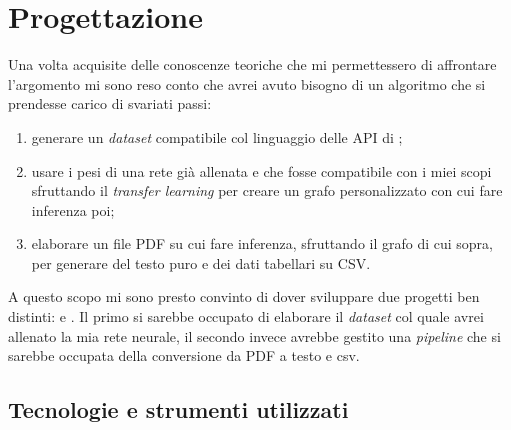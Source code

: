 

\chapter{Progettazione}
\label{cap:progettazione}

Una volta acquisite delle conoscenze teoriche che mi permettessero di affrontare l'argomento mi sono reso conto che avrei avuto bisogno di un algoritmo che si prendesse carico di svariati passi:
\begin{enumerate}
	\item generare un \textit{dataset} compatibile col linguaggio delle API di \cite{prod:tensorflow};
	\item usare i pesi di una rete già allenata e che fosse compatibile con i miei scopi sfruttando il \textit{transfer learning} per creare un grafo personalizzato con cui fare inferenza poi;
	\item elaborare un file PDF su cui fare inferenza, sfruttando il grafo di cui sopra, per generare del testo puro e dei dati tabellari su CSV.
\end{enumerate}
A questo scopo mi sono presto convinto di dover sviluppare due progetti ben distinti: \cite{prod:TableTrainNet} e \cite{prod:IntelligentOCR}. Il primo si sarebbe occupato di elaborare il \textit{dataset} col quale avrei allenato la mia rete neurale, il secondo invece avrebbe gestito una \textit{pipeline} che si sarebbe occupata della conversione da PDF a testo e csv.

\section{Tecnologie e strumenti utilizzati}
\label{sec:tecnologie-strumenti}
